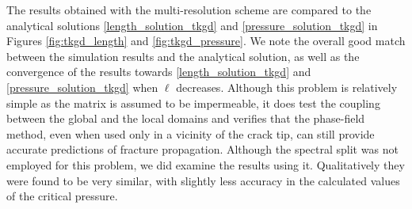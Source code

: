 The results obtained with the multi-resolution scheme are compared to the analytical solutions \ref{length_solution_tkgd} and \ref{pressure_solution_tkgd} in Figures \ref{fig:tkgd_length} and \ref{fig:tkgd_pressure}. We note the overall good match between the simulation results and the analytical solution, as well as the convergence of the results towards \ref{length_solution_tkgd} and \ref{pressure_solution_tkgd} when $\ell$ decreases. Although this problem is relatively simple as the matrix is assumed to be impermeable, it does test the coupling between the global and the local domains and verifies that the phase-field method, even when used only in a vicinity of the crack tip, can still provide accurate predictions of fracture propagation. Although the spectral split was not employed for this problem, we did examine the results using it.  Qualitatively they were found to be very similar, with slightly less accuracy in the calculated values of the critical pressure.   

